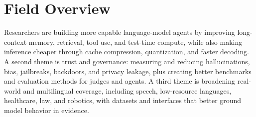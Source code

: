 \documentclass[12pt,letterpaper]{article}
\begin{document}
\medskip
\section*{Field Overview}
{\footnotesize Researchers are building more capable language-model agents by improving long-context memory, retrieval, tool use, and test-time compute, while also making inference cheaper through cache compression, quantization, and faster decoding. A second theme is trust and governance: measuring and reducing hallucinations, bias, jailbreaks, backdoors, and privacy leakage, plus creating better benchmarks and evaluation methods for judges and agents. A third theme is broadening real-world and multilingual coverage, including speech, low-resource languages, healthcare, law, and robotics, with datasets and interfaces that better ground model behavior in evidence.}
\end{document}
